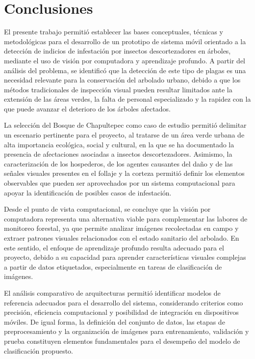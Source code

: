 \newpage

\section{Conclusiones}

El presente trabajo permitió establecer las bases conceptuales, técnicas y metodológicas para el desarrollo de un prototipo de sistema móvil orientado a la detección de indicios de infestación por insectos descortezadores en árboles, mediante el uso de visión por computadora y aprendizaje profundo. A partir del análisis del problema, se identificó que la detección de este tipo de plagas es una necesidad relevante para la conservación del arbolado urbano, debido a que los métodos tradicionales de inspección visual pueden resultar limitados ante la extensión de las áreas verdes, la falta de personal especializado y la rapidez con la que puede avanzar el deterioro de los árboles afectados.

La selección del Bosque de Chapultepec como caso de estudio permitió delimitar un escenario pertinente para el proyecto, al tratarse de un área verde urbana de alta importancia ecológica, social y cultural, en la que se ha documentado la presencia de afectaciones asociadas a insectos descortezadores. Asimismo, la caracterización de los hospederos, de los agentes causantes del daño y de las señales visuales presentes en el follaje y la corteza permitió definir los elementos observables que pueden ser aprovechados por un sistema computacional para apoyar la identificación de posibles casos de infestación.

Desde el punto de vista computacional, se concluye que la visión por computadora representa una alternativa viable para complementar las labores de monitoreo forestal, ya que permite analizar imágenes recolectadas en campo y extraer patrones visuales relacionados con el estado sanitario del arbolado. En este sentido, el enfoque de aprendizaje profundo resulta adecuado para el proyecto, debido a su capacidad para aprender características visuales complejas a partir de datos etiquetados, especialmente en tareas de clasificación de imágenes.

El análisis comparativo de arquitecturas permitió identificar modelos de referencia adecuados para el desarrollo del sistema, considerando criterios como precisión, eficiencia computacional y posibilidad de integración en dispositivos móviles. De igual forma, la definición del conjunto de datos, las etapas de preprocesamiento y la organización de imágenes para entrenamiento, validación y prueba constituyen elementos fundamentales para el desempeño del modelo de clasificación propuesto.

